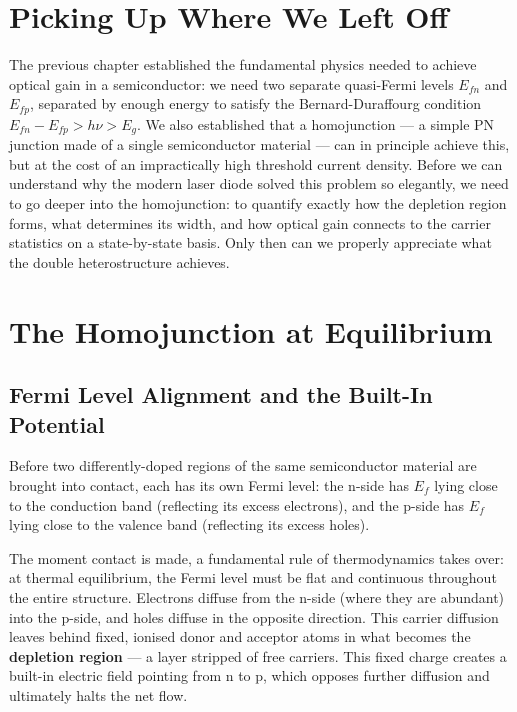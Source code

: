 
\section{Picking Up Where We Left Off}

The previous chapter established the fundamental physics needed to achieve optical gain in a semiconductor: we need two separate quasi-Fermi levels $E_{fn}$ and $E_{fp}$, separated by enough energy to satisfy the Bernard-Duraffourg condition $E_{fn} - E_{fp} > h\nu > E_g$. We also established that a homojunction — a simple PN junction made of a single semiconductor material — can in principle achieve this, but at the cost of an impractically high threshold current density. Before we can understand why the modern laser diode solved this problem so elegantly, we need to go deeper into the homojunction: to quantify exactly how the depletion region forms, what determines its width, and how optical gain connects to the carrier statistics on a state-by-state basis. Only then can we properly appreciate what the double heterostructure achieves.

\section{The Homojunction at Equilibrium}

\subsection{Fermi Level Alignment and the Built-In Potential}

Before two differently-doped regions of the same semiconductor material are brought into contact, each has its own Fermi level: the n-side has $E_f$ lying close to the conduction band (reflecting its excess electrons), and the p-side has $E_f$ lying close to the valence band (reflecting its excess holes).

The moment contact is made, a fundamental rule of thermodynamics takes over: at thermal equilibrium, the Fermi level must be flat and continuous throughout the entire structure. Electrons diffuse from the n-side (where they are abundant) into the p-side, and holes diffuse in the opposite direction. This carrier diffusion leaves behind fixed, ionised donor and acceptor atoms in what becomes the \textbf{depletion region} — a layer stripped of free carriers. This fixed charge creates a built-in electric field pointing from n to p, which opposes further diffusion and ultimately halts the net flow.

